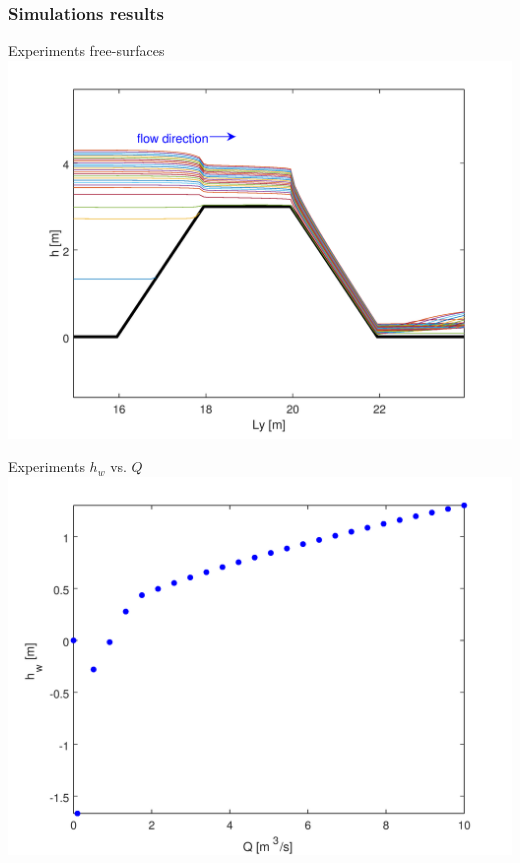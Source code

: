 \documentclass[xcolor=dvipsnames, USenglish]{beamer}  %
\begin{document}
  \begin{frame}
    \frametitle{Simulations results}
    \begin{minipage}{.5\textwidth}
      \centering
      \small{Experiments free-surfaces}\\
      \includegraphics[width=\textwidth]{img/free_surfaces.png}
    \end{minipage}%
    \begin{minipage}{.5\textwidth}
      \centering
      \small{Experiments $h_w$ vs. $Q$}\\
      \includegraphics[width=\textwidth]{img/simulation_results.png}
    \end{minipage}
    \vfill
  \end{frame}
\end{document}
